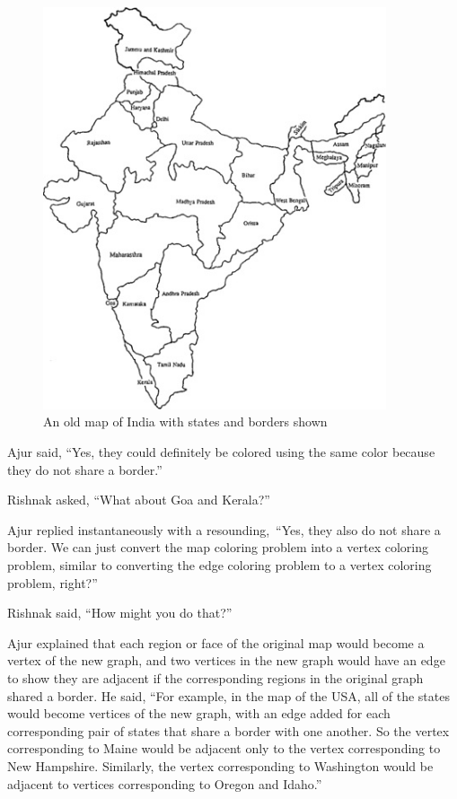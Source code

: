 \begin{figure}
\begin{center}
\includegraphics[width=0.9\textwidth]{MapIndia.jpg}
\end{center}
\caption{An old map of India with states and borders shown}\label{10g10}
\end{figure}

Ajur said, ``Yes, they could definitely be colored using the same color because they do not share a border.''

Rishnak asked, ``What about Goa and Kerala?''

Ajur replied instantaneously with a resounding,~``Yes, they also do not share a border. We can just convert the map coloring problem into a vertex coloring problem, similar to converting the edge coloring problem to a vertex coloring problem, right?''

Rishnak said, ``How might you do that?''

Ajur explained that each region or face of the original map would become a vertex of the new graph, and two vertices in the new graph would have an edge to show they are adjacent if the corresponding regions in the original graph shared a border. He said, ``For example, in the map of the USA, all of the states would become vertices of the new graph, with an edge added for each corresponding pair of states that share a border with one another. So the vertex corresponding to Maine would be adjacent only to the vertex corresponding to New Hampshire. Similarly, the vertex corresponding to Washington would be adjacent to vertices corresponding to Oregon and Idaho.'' 

